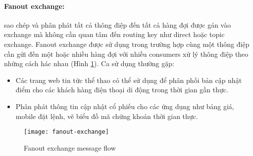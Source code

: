 \paragraph{Fanout exchange:} sao chép và phân phát tất cả thông điệp đến tất cả hàng đợi được gán vào exchange mà không cần quan tâm đến routing key như direct hoặc topic exchange. Fanout exchange được sử dụng trong trường hợp cùng một thông điệp cần gửi đến một hoặc nhiều hàng đợi với nhiều consumers xử lý thông điệp theo những cách hác nhau (Hình \ref{fig:fanoutExchange}). Ca sử dụng thường gặp:
\begin{itemize}
	\item Các trang web tin tức thể thao có thể sử dụng để phân phối bản cập nhật điểm cho các khách hàng điện thoại di động trong thời gian gần thực.
	\item Phân phát thông tin cập nhật cổ phiếu cho các ứng dụng như bảng giá, mobile đặt lệnh, vẽ biểu đồ mã chứng khoán thời gian thực.
\end{itemize}
\begin{figure}[h]
    \centering
    \texttt{[image: fanout-exchange]}
    \caption{Fanout exchange message flow}
    \label{fig:fanoutExchange}
\end{figure}